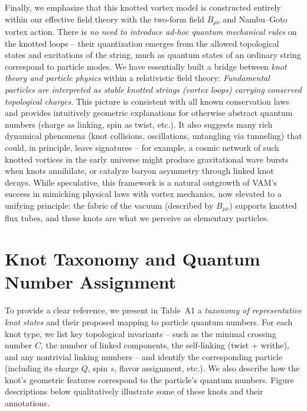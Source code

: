 \documentclass[12pt]{article}
\begin{document}
Finally, we emphasize that this knotted vortex model is constructed entirely within our effective field theory with the two-form field $B_{\mu\nu}$ and Nambu–Goto vortex action. There is \emph{no need to introduce ad-hoc quantum mechanical rules} on the knotted loops – their quantization emerges from the allowed topological states and excitations of the string, much as quantum states of an ordinary string correspond to particle modes. We have essentially built a bridge between \emph{knot theory and particle physics} within a relativistic field theory: \emph{Fundamental particles are interpreted as stable knotted strings (vortex loops) carrying conserved topological charges}. This picture is consistent with all known conservation laws and provides intuitively geometric explanations for otherwise abstract quantum numbers (charge as linking, spin as twist, etc.). It also suggests many rich dynamical phenomena (knot collisions, oscillations, untangling via tunneling) that could, in principle, leave signatures – for example, a cosmic network of such knotted vortices in the early universe might produce gravitational wave bursts when knots annihilate\cite{arxiv2407.11731}, or catalyze baryon asymmetry through linked knot decays\cite{arxiv2407.11731}. While speculative, this framework is a natural outgrowth of VAM’s success in mimicking physical laws with vortex mechanics, now elevated to a unifying principle: the fabric of the vacuum (described by $B_{\mu\nu}$) supports knotted flux tubes, and these knots are what we perceive as elementary particles.

\appendix
\section{Knot Taxonomy and Quantum Number Assignment}
To provide a clear reference, we present in Table~A1 a \emph{taxonomy of representative knot states} and their proposed mapping to particle quantum numbers. For each knot type, we list key topological invariants – such as the minimal crossing number $C$, the number of linked components, the self-linking (twist + writhe), and any nontrivial linking numbers – and identify the corresponding particle (including its charge $Q$, spin $s$, flavor assignment, etc.). We also describe how the knot’s geometric features correspond to the particle’s quantum numbers. Figure descriptions below qualitatively illustrate some of these knots and their annotations.
\end{document}
